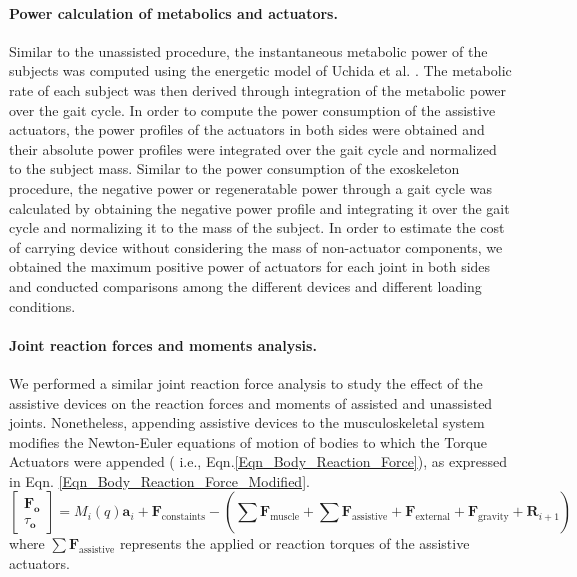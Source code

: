\documentclass[10pt,letterpaper]{article}
\begin{document}
\paragraph*{Power calculation of metabolics and actuators.} Similar to the unassisted procedure, the instantaneous metabolic power of the subjects was computed using the energetic model of Uchida et al. \cite{106}. The metabolic rate of each subject was then derived through integration of the metabolic power over the gait cycle. In order to compute the power consumption of the assistive actuators, the power profiles of the actuators in both sides were obtained and their absolute power profiles were integrated over the gait cycle and normalized to the subject mass. Similar to the power consumption of the exoskeleton procedure, the negative power or regeneratable power through a gait cycle was calculated by obtaining the negative power profile and integrating it over the gait cycle and normalizing it to the mass of the subject. In order to estimate the cost of carrying device without considering the mass of non-actuator components, we obtained the maximum positive power of actuators for each joint in both sides and conducted comparisons among the different devices and different loading conditions.\\
\paragraph{Joint reaction forces and moments analysis.} We performed a similar joint reaction force analysis to study the effect of the assistive devices on the reaction forces and moments of assisted and unassisted joints. Nonetheless, appending assistive devices to the musculoskeletal system modifies the Newton-Euler equations of motion of bodies to which the Torque Actuators were appended ( i.e., Eqn.\eqref{Eqn_Body_Reaction_Force}), as expressed in Eqn. \eqref{Eqn_Body_Reaction_Force_Modified}.
\begin{equation}\label{Eqn_Body_Reaction_Force_Modified}
\left\lbrack \begin{array}{c}
{\mathit{\mathbf{F}}}_{\mathit{\mathbf{o}}} \\
\tau_{\mathit{\mathbf{o}}} 
\end{array}\right\rbrack =M_i \left(q\right){\mathit{\mathbf{a}}}_i +{\mathit{\mathbf{F}}}_{\mathrm{c}\mathrm{o}\mathrm{n}\mathrm{s}\mathrm{t}\mathrm{a}\mathrm{i}\mathrm{n}\mathrm{t}\mathrm{s}} -\left(\sum_{\;}^{\;} {\mathit{\mathbf{F}}}_{\mathrm{m}\mathrm{u}\mathrm{s}\mathrm{c}\mathrm{l}\mathrm{e}} +\sum{\mathit{\mathbf{F}}}_{\mathrm{assistive}} +{\mathit{\mathbf{F}}}_{\mathrm{e}\mathrm{x}\mathrm{t}\mathrm{e}\mathrm{r}\mathrm{n}\mathrm{a}\mathrm{l}} +{\mathit{\mathbf{F}}}_{\mathrm{g}\mathrm{r}\mathrm{a}\mathrm{v}\mathrm{i}\mathrm{t}\mathrm{y}} +{\mathit{\mathbf{R}}}_{i+1} \right)
\end{equation}
where $\sum{\mathit{\mathbf{F}}}_{\mathrm{assistive}}$ represents the applied or reaction torques of the assistive actuators.
\end{document}
